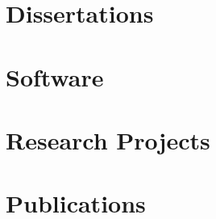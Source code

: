 \documentclass[11pt,fleqn]{book} %
\begin{document}

\chapter{Dissertations}
\newpage



%	

\chapter{Software}
\newpage


    

%    
%        




\chapter{Research Projects}
\newpage



\chapter{Publications}
\newpage
\nocite{*}

\end{document}
